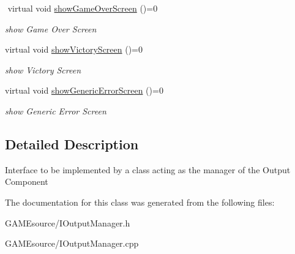 \begin{DoxyCompactItemize}
$$\mbox{\label{class_i_output_manager_adc5ca9af7dc69324ee87233dcc7befc4}} 
virtual void \mbox{\hyperlink{class_i_output_manager_adc5ca9af7dc69324ee87233dcc7befc4}{show\+Game\+Over\+Screen}} ()=0
\begin{DoxyCompactList}\small\item\em show Game Over Screen \end{DoxyCompactList}\item 
\mbox{\label{class_i_output_manager_a89c5e1c35d72fb788db8b34eba956efe}} 
virtual void \mbox{\hyperlink{class_i_output_manager_a89c5e1c35d72fb788db8b34eba956efe}{show\+Victory\+Screen}} ()=0
\begin{DoxyCompactList}\small\item\em show Victory Screen \end{DoxyCompactList}\item 
\mbox{\label{class_i_output_manager_a9420b7d761af05b5ad23eadf074337f2}} 
virtual void \mbox{\hyperlink{class_i_output_manager_a9420b7d761af05b5ad23eadf074337f2}{show\+Generic\+Error\+Screen}} ()=0
\begin{DoxyCompactList}\small\item\em show Generic Error Screen \end{DoxyCompactList}\end{DoxyCompactItemize}


\subsection{Detailed Description}
Interface to be implemented by a class acting as the manager of the Output Component 

The documentation for this class was generated from the following files\+:\begin{DoxyCompactItemize}
\item 
G\+A\+M\+Esource/I\+Output\+Manager.\+h\item 
G\+A\+M\+Esource/I\+Output\+Manager.\+cpp\end{DoxyCompactItemize}
